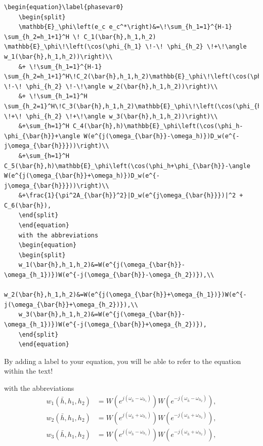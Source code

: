 \begin{mdframed}
	\begin{lstlisting}[language = Tex, caption={Add formulars to your text, splitted equations}]
	\begin{equation}\label{phasevar0}
	\begin{split}
	\mathbb{E}_\phi\left(e_c e_c^*\right)&=\!\sum_{h_1=1}^{H-1} \sum_{h_2=h_1+1}^H \! C_1(\bar{h},h_1,h_2) \mathbb{E}_\phi\!\left(\cos(\phi_{h_1} \!-\! \phi_{h_2} \!+\!\angle w_1(\bar{h},h_1,h_2))\right)\\
	&+ \!\sum_{h_1=1}^{H-1} \sum_{h_2=h_1+1}^H\!C_2(\bar{h},h_1,h_2)\mathbb{E}_\phi\!\left(\cos(\phi_{h_1} \!-\! \phi_{h_2} \!-\!\angle w_2(\bar{h},h_1,h_2))\right)\\
	&+ \!\sum_{h_1=1}^H \sum_{h_2=1}^H\!C_3(\bar{h},h_1,h_2)\mathbb{E}_\phi\!\left(\cos(\phi_{h_1} \!+\! \phi_{h_2} \!+\!\angle w_3(\bar{h},h_1,h_2))\right)\\
	&+\sum_{h=1}^H C_4(\bar{h},h)\mathbb{E}_\phi\left(\cos(\phi_h-\phi_{\bar{h}}+\angle W(e^{j(\omega_{\bar{h}}-\omega_h)})D_w(e^{-j\omega_{\bar{h}}}))\right)\\
	&+\sum_{h=1}^H C_5(\bar{h},h)\mathbb{E}_\phi\left(\cos(\phi_h+\phi_{\bar{h}}-\angle W(e^{j(\omega_{\bar{h}}+\omega_h)})D_w(e^{-j\omega_{\bar{h}}}))\right)\\
	&+\frac{1}{\pi^2A_{\bar{h}}^2}|D_w(e^{j\omega_{\bar{h}}})|^2 + C_6(\bar{h}),
	\end{split}
	\end{equation}
	with the abbreviations
	\begin{equation}
	\begin{split}
	w_1(\bar{h},h_1,h_2)&=W(e^{j(\omega_{\bar{h}}-\omega_{h_1})})W(e^{-j(\omega_{\bar{h}}-\omega_{h_2})}),\\
	w_2(\bar{h},h_1,h_2)&=W(e^{j(\omega_{\bar{h}}+\omega_{h_1})})W(e^{-j(\omega_{\bar{h}}+\omega_{h_2})}),\\
	w_3(\bar{h},h_1,h_2)&=W(e^{j(\omega_{\bar{h}}-\omega_{h_1})})W(e^{-j(\omega_{\bar{h}}+\omega_{h_2})}),
	\end{split}
	\end{equation}
	\end{lstlisting}
	By adding a label to your equation, you will be able to refer to the equation within the text!
\end{mdframed}
with the abbreviations
\begin{equation}
\begin{split}
w_1(\bar{h},h_1,h_2)&=W(e^{j(\omega_{\bar{h}}-\omega_{h_1})})W(e^{-j(\omega_{\bar{h}}-\omega_{h_2})}),\\
w_2(\bar{h},h_1,h_2)&=W(e^{j(\omega_{\bar{h}}+\omega_{h_1})})W(e^{-j(\omega_{\bar{h}}+\omega_{h_2})}),\\
w_3(\bar{h},h_1,h_2)&=W(e^{j(\omega_{\bar{h}}-\omega_{h_1})})W(e^{-j(\omega_{\bar{h}}+\omega_{h_2})}),
\end{split}
\end{equation}
